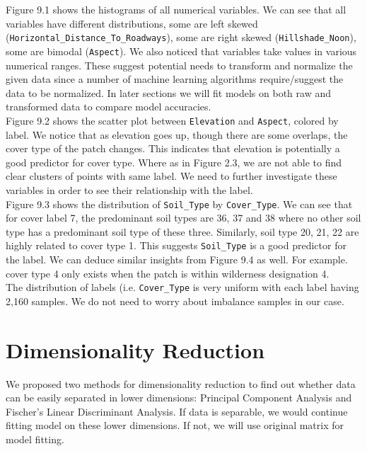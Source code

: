 \documentclass[11pt]{article}
\begin{document}

\noindent Figure 9.1 shows the histograms of all numerical variables. We can see that all variables have different distributions, some are left skewed (\texttt{Horizontal\_Distance\_To\_Roadways}), some are right skewed (\texttt{Hillshade\_Noon}), some are bimodal (\texttt{Aspect}). We also noticed that variables take values in various numerical ranges. These suggest potential needs to transform and normalize the given data since a number of machine learning algorithms require/suggest the data to be normalized. In later sections we will fit models on both raw and transformed data to compare model accuracies. \\


\noindent Figure 9.2 shows the scatter plot between \texttt{Elevation} and \texttt{Aspect}, colored by label. We notice that as elevation goes up, though there are some overlaps, the cover type of the patch changes. This indicates that elevation is potentially a good predictor for cover type. Where as in Figure 2.3, we are not able to find clear clusters of points with same label. We need to further investigate these variables in order to see their relationship with the label. \\


\noindent Figure 9.3 shows the distribution of \texttt{Soil\_Type} by \texttt{Cover\_Type}. We can see that for cover label 7, the predominant soil types are 36, 37 and 38 where no other soil type has a predominant soil type of these three. Similarly, soil type 20, 21, 22 are highly related to cover type 1. This suggests \texttt{Soil\_Type} is a good predictor for the label. We can deduce similar insights from Figure 9.4 as well. For example. cover type 4 only exists when the patch is within wilderness designation 4. \\


\noindent The distribution of labels (i.e. \texttt{Cover\_Type} is very uniform with each label having 2,160 samples. We do not need to worry about imbalance samples in our case.


\section{Dimensionality Reduction}

We proposed two methods for dimensionality reduction to find out whether data can be easily separated in lower dimensions: Principal Component Analysis and Fischer's Linear Discriminant Analysis. If data is separable, we would continue fitting model on these lower dimensions. If not, we will use original matrix for model fitting.
\end{document}
